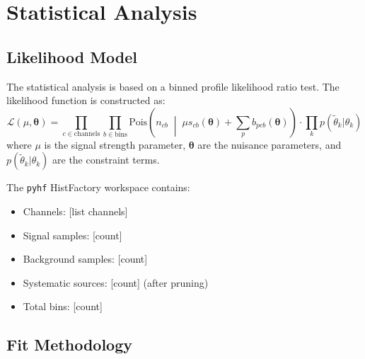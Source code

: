 
\section{Statistical Analysis}
\label{sec:statistical}


\subsection{Likelihood Model}
\label{sec:statistical:likelihood}


The statistical analysis is based on a binned profile likelihood ratio test.
The likelihood function is constructed as:
\begin{equation}
  \mathcal{L}(\mu, \boldsymbol{\theta}) =
  \prod_{c \in \text{channels}} \prod_{b \in \text{bins}}
  \text{Pois}\!\left(n_{cb} \;\middle|\; \mu s_{cb}(\boldsymbol{\theta})
  + \sum_p b_{pcb}(\boldsymbol{\theta})\right)
  \cdot \prod_k p(\tilde{\theta}_k | \theta_k)
\end{equation}
where $\mu$ is the signal strength parameter, $\boldsymbol{\theta}$ are the
nuisance parameters, and $p(\tilde{\theta}_k | \theta_k)$ are the constraint
terms.


The \texttt{pyhf} HistFactory workspace contains:
\begin{itemize}
  \item Channels: [list channels]
  \item Signal samples: [count]
  \item Background samples: [count]
  \item Systematic sources: [count] (after pruning)
  \item Total bins: [count]
\end{itemize}

\subsection{Fit Methodology}
\label{sec:statistical:fit}

